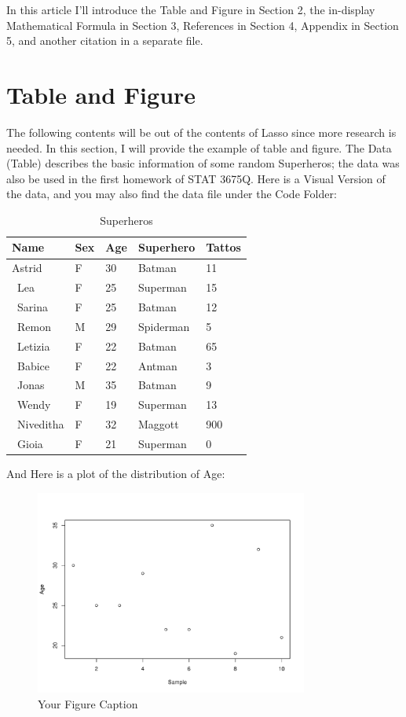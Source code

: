 \documentclass{article}
\begin{document}
In this article I'll introduce the Table and Figure in Section 2, the in-display Mathematical Formula in Section 3, References in Section 4, Appendix in Section 5, and another citation in a separate file.

\section*{Table and Figure}
The following contents will be out of the contents of Lasso since more research is needed. In this section, I will provide the example of table and figure. The Data (Table) describes the basic information of some random Superheros; the data was also be used in the first homework of STAT 3675Q. Here is a Visual Version of the data, and you may also find the data file under the Code Folder:

\begin{table}[h]
\begin{center}
\caption{Superheros}
\begin{tabular}{|l|l|l|l|l|}
\hline
Name      & Sex & Age & Superhero & Tattos \\ \hline
Astrid    & F   & 30  & Batman    & 11     \\ \
Lea       & F   & 25  & Superman  & 15     \\ \
Sarina    & F   & 25  & Batman    & 12     \\ \
Remon     & M   & 29  & Spiderman & 5      \\ \
Letizia   & F   & 22  & Batman    & 65     \\ \
Babice    & F   & 22  & Antman    & 3      \\ \
Jonas     & M   & 35  & Batman    & 9      \\ \
Wendy     & F   & 19  & Superman  & 13     \\ \
Niveditha & F   & 32  & Maggott   & 900    \\ \
Gioia     & F   & 21  & Superman  & 0      \\ \hline
\end{tabular}
\end{center}
\end{table}
And Here is a plot of the distribution of Age:
\begin{figure}[htbp]
    \centering
    \includegraphics[width=0.8\textwidth]{Figure.pdf}
    \caption{Your Figure Caption}
    \label{fig:your-label}
\end{figure}
\end{document}
